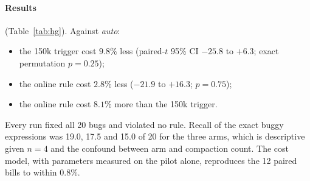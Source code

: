 \documentclass[11pt]{article}
\begin{document}
\paragraph{Results} (Table~\ref{tab:hg}). Against \emph{auto}:
\begin{itemize}
\item the 150k trigger cost $9.8\%$ less (paired-$t$ 95\% CI $-25.8$ to $+6.3$; exact permutation $p=0.25$);
\item the online rule cost $2.8\%$ less ($-21.9$ to $+16.3$; $p=0.75$);
\item the online rule cost $8.1\%$ more than the 150k trigger.
\end{itemize}
Every run fixed all 20 bugs and violated no rule. Recall of the exact buggy expressions was 19.0, 17.5 and 15.0 of 20 for the three arms, which is descriptive given $n=4$ and the confound between arm and compaction count. The cost model, with parameters measured on the pilot alone, reproduces the 12 paired bills to within 0.8\%.

\begin{table}[t]
\centering
\small
\caption{Real sessions past $H^\star$: Claude Code (Sonnet 5.5), four paired orderings, means. Bill components in \$ per run from \texttt{modelUsage}. ``History'' is cache-read spend net of reading the static prefix. Recall counts exact buggy expressions reproduced at the end.}
\label{tab:hg}

\end{table}
\end{document}
